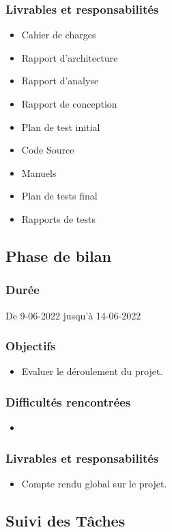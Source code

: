 \documentclass[11pt,fleqn]{book} %
\begin{document}
\subsubsection{Livrables et responsabilités}
\begin{itemize}
    \item Cahier de charges
    \item Rapport d’architecture
    \item Rapport d’analyse
    \item Rapport de conception
    \item Plan de test initial
    \item Code Source
    \item Manuels
    \item Plan de tests final
    \item Rapports de tests
\end{itemize}


\subsection{Phase de bilan}
\subsubsection{Durée}
De 9-06-2022 jusqu’à 14-06-2022
\subsubsection{Objectifs}
\begin{itemize}
    \item  Evaluer le déroulement du projet.
\end{itemize}
\subsubsection{Difficultés rencontrées}
\begin{itemize}
    \item 
\end{itemize}
\subsubsection{Livrables et responsabilités}
\begin{itemize}
    \item Compte rendu global sur le projet.
\end{itemize}


\subsection{ Suivi des Tâches}
\end{document}
